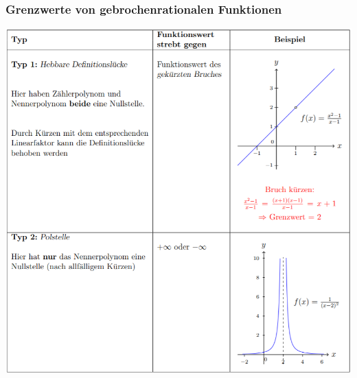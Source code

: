 \subsubsection{Grenzwerte von gebrochenrationalen Funktionen}
\begin{center}
    \includegraphics[width=1\linewidth]{images/grenzrational.png}
\end{center}